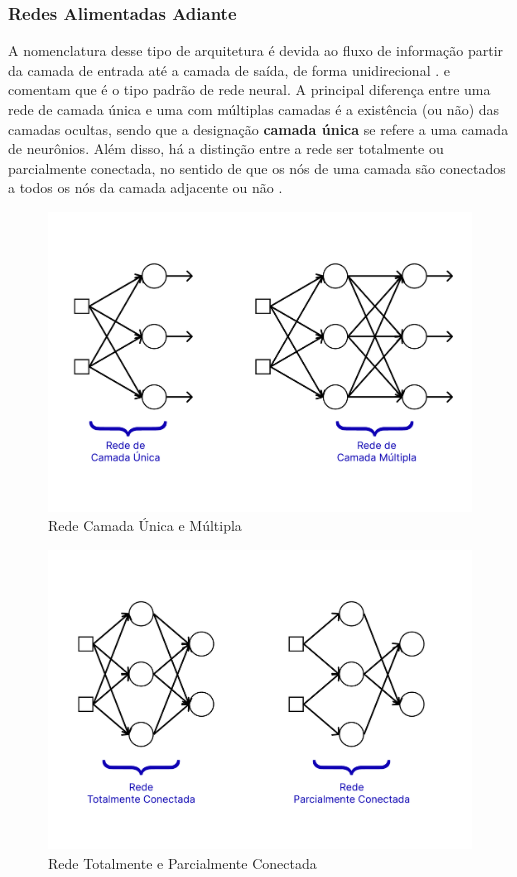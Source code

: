 \documentclass[twoside]{automatextcc}
\begin{document}
\subsubsection{Redes Alimentadas Adiante}
A nomenclatura desse tipo de arquitetura é devida ao fluxo de informação partir da camada de entrada até a camada de saída, de forma unidirecional \citep{goodfellow2016}. \citet{hastie2008} e \citet{fan2021} comentam que é o tipo padrão de rede neural. A principal diferença entre uma rede de camada única e uma com múltiplas camadas é a existência (ou não) das camadas ocultas, sendo que a designação \textbf{camada única} se refere a uma camada de neurônios. Além disso, há a distinção entre a rede ser totalmente ou parcialmente conectada, no sentido de que os nós de uma camada são conectados a todos os nós da camada adjacente ou não \citep{haykin2009}. 

\begin{figure}[ht!]
    \centering
    \includegraphics[width=.7\textwidth]{figuras/network_layers.pdf}
	\caption{Rede Camada Única e Múltipla \citep[adaptado de][]{haykin2009}}
\end{figure}

\begin{figure}[ht!]
    \centering
    \includegraphics[width=.7\textwidth]{figuras/network_connections.pdf}
	\caption{Rede Totalmente e Parcialmente Conectada \citep[adaptado de][]{haykin2009}}
\end{figure}
\end{document}
